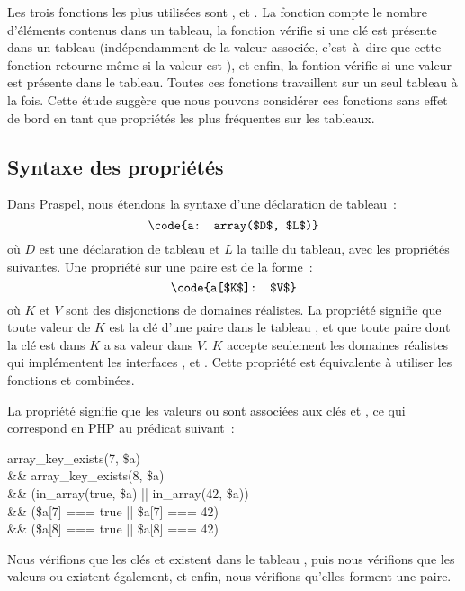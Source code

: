 %
Les trois fonctions les plus utilisées sont ,
 et . La fonction 
compte le nombre d'éléments contenus dans un tableau, la fonction
 vérifie si une clé est présente dans un tableau
(indépendamment de la valeur associée, c'est~à~dire que cette fonction retourne
 même si la valeur est ), et enfin, la fontion
 vérifie si une valeur est présente dans le tableau. Toutes
ces fonctions travaillent sur un seul tableau à la fois. Cette étude suggère que
nous pouvons considérer ces fonctions sans effet de bord en tant que propriétés
les plus fréquentes sur les tableaux.

\subsection{Syntaxe des propriétés}
\label{subsection:data:array_properties}

Dans Praspel, nous étendons la syntaxe d'une déclaration de tableau~:
%
$$\code{a: array($D$, $L$)}$$
%
où $D$ est une déclaration de tableau et $L$ la taille du tableau, avec les
propriétés suivantes. Une propriété sur une paire est de la forme~:
%
$$\code{a[$K$]: $V$}$$
%
où $K$ et $V$ sont des disjonctions de domaines réalistes. La propriété signifie
que toute valeur de $K$ est la clé d'une paire dans le tableau , et que
toute paire dont la clé est dans $K$ a sa valeur dans $V$. $K$ accepte seulement
les domaines réalistes qui implémentent les interfaces ,
 et . Cette propriété est équivalente à utiliser
les fonctions  et  combinées.

\begin{example}

La propriété  signifie que les valeurs  ou
 sont associées aux clés  et , ce qui correspond en PHP
au prédicat suivant~:
%
\begin{pre}
   array\_key\_exists(7, \$a) \\
\&\& array\_key\_exists(8, \$a) \\
\&\& (in\_array(true, \$a) || in\_array(42, \$a)) \\
\&\& (\$a[7] === true     || \$a[7] === 42) \\
\&\& (\$a[8] === true     || \$a[8] === 42)
\end{pre}
%
Nous vérifions que les clés  et  existent dans le tableau
, puis nous vérifions que les valeurs  ou 
existent également, et enfin, nous vérifions qu'elles forment une paire.

\end{example}

